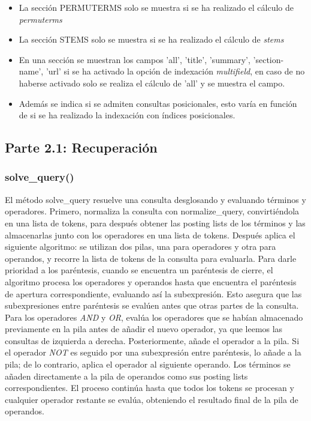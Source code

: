 \documentclass[12pt,a4paper]{article}
\begin{document}
\begin{itemize}
  \item La sección PERMUTERMS solo se muestra si se ha realizado el cálculo de \textit{permuterms}
  \item La sección STEMS solo se muestra si se ha realizado el cálculo de \textit{stems}
  \item En una sección se muestran los campos 'all', 'title', 'summary', 'section-name', 'url' si se ha activado la opción de indexación \textit{multifield}, en caso de no haberse activado solo se realiza el cálculo de 'all' y se muestra el campo.
  \item Además se indica si se admiten consultas posicionales, esto varía en función de si se ha realizado la indexación con índices posicionales. 
\end{itemize}

\subsection{Parte 2.1: Recuperación}
\subsubsection{solve\_query()}
El método solve\_query resuelve una consulta desglosando y evaluando términos y operadores. Primero, normaliza la consulta con normalize\_query, convirtiéndola en una lista de tokens, para después obtener las posting lists de los términos y las almacenarlas junto con los operadores en una lista de tokens.
Después aplica el siguiente algoritmo: se utilizan dos pilas, una para operadores y otra para operandos, y recorre la lista de tokens de la consulta para evaluarla. Para darle prioridad a los paréntesis, cuando se encuentra un paréntesis de cierre, el algoritmo procesa los operadores y operandos hasta que encuentra el paréntesis de apertura correspondiente, evaluando así la subexpresión. Esto asegura que las subexpresiones entre paréntesis se evalúen antes que otras partes de la consulta. Para los operadores \textit{AND} y \textit{OR}, evalúa los operadores que se habían almacenado previamente en la pila antes de añadir el nuevo operador, ya que leemos las consultas de izquierda a derecha. Posteriormente, añade el operador a la pila. Si el operador \textit{NOT} es seguido por una subexpresión entre paréntesis, lo añade a la pila; de lo contrario, aplica el operador al siguiente operando. Los términos se añaden directamente a la pila de operandos como sus posting lists correspondientes. El proceso continúa hasta que todos los tokens se procesan y cualquier operador restante se evalúa, obteniendo el resultado final de la pila de operandos. 
\end{document}
